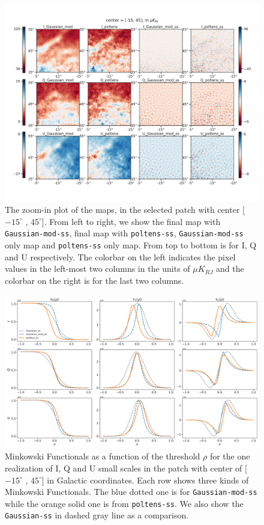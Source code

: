 \documentclass[twocolumn]{aastex631}
\begin{document}
\begin{figure}[hbt]
    \centering
    \includegraphics[width=180mm]{figures/maps_patch_345_35.pdf}
    \caption{The zoom-in plot of the maps, in the selected patch with center [$-15^{\circ}$ , $45^{\circ} $]. From left to right, we show the final map with \texttt{Gaussian-mod-ss}, final map with \texttt{poltens-ss}, \texttt{Gaussian-mod-ss} only map and \texttt{poltens-ss} only map. From top to bottom is for I, Q and U respectively. The colorbar on the left indicates the pixel values in the left-most two columns in the units of $\mu K_{RJ}$ and the colorbar on the right is for the last two columns. }
    \label{fig:maps:patch2}
\end{figure}
\begin{figure}[hbt]
    \centering
    \includegraphics[width=180mm]{figures/MFs_345_45_with_G_rescaled.pdf}
    \caption{Minkowski Functionals as a function of the threshold $\rho$ for the one realization of I, Q and U small scales in the patch with center of [$-15^{\circ}$ , $45^{\circ} $] in Galactic coordinates. Each row shows three kinds of Minkowski Functionals. The blue dotted one is for \texttt{Gaussian-mod-ss} while the orange solid one is from \texttt{poltens-ss}. We also show the \texttt{Gaussian-ss} in dashed gray line as a comparison.}
    \label{fig:MF:patch2}
\end{figure}
\end{document}
